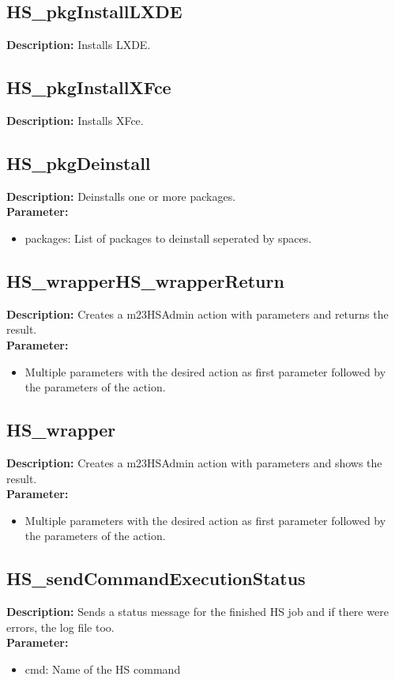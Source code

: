 \subsection{HS\_pkgInstallLXDE}
\textbf{Description:} Installs LXDE.\\

\subsection{HS\_pkgInstallXFce}
\textbf{Description:} Installs XFce.\\

\subsection{HS\_pkgDeinstall}
\textbf{Description:} Deinstalls one or more packages.\\
\textbf{Parameter:}
\begin{itemize}
\item packages: List of packages to deinstall seperated by spaces.
\end{itemize}

\subsection{HS\_wrapperHS\_wrapperReturn}
\textbf{Description:} Creates a m23HSAdmin action with parameters and returns the result.\\
\textbf{Parameter:}
\begin{itemize}
\item Multiple parameters with the desired action as first parameter followed by the parameters of the action.
\end{itemize}

\subsection{HS\_wrapper}
\textbf{Description:} Creates a m23HSAdmin action with parameters and shows the result.\\
\textbf{Parameter:}
\begin{itemize}
\item Multiple parameters with the desired action as first parameter followed by the parameters of the action.
\end{itemize}

\subsection{HS\_sendCommandExecutionStatus}
\textbf{Description:} Sends a status message for the finished HS job and if there were errors, the log file too.\\
\textbf{Parameter:}
\begin{itemize}
\item cmd: Name of the HS command
\end{itemize}

